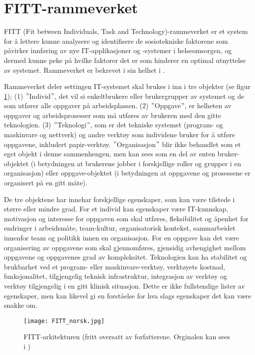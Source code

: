 \section{FITT-rammeverket}
\label{sec:fitt-rammeverket}

FITT (Fit between Individuals, Task and Technology)-rammeverket er et system for å lettere kunne analysere og identifisere de sosiotekniske faktorene som påvirker innføring av nye IT-applikasjoner og -systemer i helseomsorgen, og dermed kunne peke på hvilke faktorer det er som hinderer en optimal utnyttelse av systemet. Rammeverket er bekrevet i sin helhet i \citep{FITT}.

\noindent
Rammeverket deler settingen IT-systemet skal brukes i inn i tre objekter (se figur \ref{FITT-arkitekturen}); (1) $"$Individ$"$, det vil si enkeltbrukere eller brukergrupper av systemet og de som utfører alle oppgaver på arbeidsplassen. (2) $"$Oppgave$"$, er helheten av oppgaver og arbeidsprosesser som må utføres av brukeren med den gitte teknologien. (3) $"$Teknologi$"$, som er det tekniske systemet (program- og maskinvare og nettverk) og andre verktøy som individene bruker for å utføre oppgavene, inkludert papir-verktøy.
$"$Organisasjon$"$ blir ikke behandlet som et eget objekt i denne sammenhengen, men kan sees som en del av enten bruker-objektet (i betydningen at brukerene jobber i forskjellige roller og grupper i en organisasjon) eller oppgave-objektet (i betydningen at oppgavene og prosessene er organisert på en gitt måte).

\noindent
De tre objektene har innehar forskjellige egenskaper, som kan være tilstede i større eller mindre grad. For et individ kan egenskaper være IT-kunnskap, motivasjon og interesse for oppgaven som skal utføres, fleksibilitet og åpenhet for endringer i arbeidsmåte, team-kultur, organisatorisk kontekst, sammarbeidet innenfor team og politikk innen en organisasjon. For en oppgave kan det være organisering av oppgavene som skal gjennomføres, gjensidig avhengighet mellom oppgavene og oppgavenes grad av kompleksitet. Teknologien kan ha stabilitet og brukbarhet ved et program- eller maskinvare-verktøy, verktøyets kostnad, funksjonalitet, tilgjengelig teknisk infrastruktur, integrasjon av verktøy og verktøy tilgjengelig i en gitt klinisk situasjon. Dette er ikke fullstendige lister av egenskaper, men kan likevel gi en forståelse for hva slags egenskaper det kan være snakke om.

\begin{figure}[H]
\centering
\texttt{[image: FITT\_norsk.jpg]}
\caption{FITT-arkitekturen (fritt oversatt av forfatterene. Orginalen kan sees i \citep{FITT})}
\label{FITT-arkitekturen}
\end{figure}


